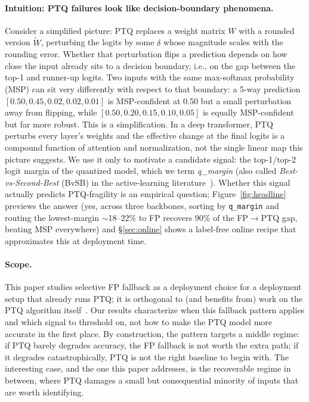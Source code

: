 \documentclass{article}
\newcommand{\fp}{\textsc{FP}\xspace}
\newcommand{\ptq}{\textsc{PTQ}\xspace}
\begin{document}
\paragraph{Intuition: PTQ failures look like decision-boundary phenomena.}
Consider a simplified picture: \ptq{} replaces a weight matrix $W$ with a rounded version $\widetilde{W}$, perturbing the logits by some $\delta$ whose magnitude scales with the rounding error. Whether that perturbation flips a prediction depends on how close the input already sits to a decision boundary, i.e., on the gap between the top-1 and runner-up logits. Two inputs with the same max-softmax probability (MSP) can sit very differently with respect to that boundary: a 5-way prediction $[0.50, 0.45, 0.02, 0.02, 0.01]$ is MSP-confident at 0.50 but a small perturbation away from flipping, while $[0.50, 0.20, 0.15, 0.10, 0.05]$ is equally MSP-confident but far more robust. This is a simplification. In a deep transformer, \ptq{} perturbs every layer's weights and the effective change at the final logits is a compound function of attention and normalization, not the single linear map this picture suggests. We use it only to motivate a candidate signal: the top-1/top-2 logit margin of the quantized model, which we term \emph{q\_margin} (also called \emph{Best-vs-Second-Best} (BvSB) in the active-learning literature~\cite{joshi2009multi}). Whether this signal actually predicts PTQ-fragility is an empirical question; Figure~\ref{fig:headline} previews the answer (yes, across three backbones, sorting by \texttt{q\_margin} and routing the lowest-margin $\sim$18--22\% to \fp{} recovers 90\% of the \fp$\to$\ptq{} gap, beating MSP everywhere) and \S\ref{sec:online} shows a label-free online recipe that approximates this at deployment time.

\paragraph{Scope.}
This paper studies selective \fp{} fallback as a deployment choice for a deployment setup that already runs \ptq{}; it is orthogonal to (and benefits from) work on the \ptq{} algorithm itself~\cite{frantar2023gptq,lin2024awq,xiao2023smoothquant,ashkboos2024quarot,li2023repqvit}. Our results characterize when this fallback pattern applies and which signal to threshold on, not how to make the \ptq{} model more accurate in the first place. By construction, the pattern targets a middle regime: if \ptq{} barely degrades accuracy, the \fp{} fallback is not worth the extra path; if it degrades catastrophically, \ptq{} is not the right baseline to begin with. The interesting case, and the one this paper addresses, is the recoverable regime in between, where \ptq{} damages a small but consequential minority of inputs that are worth identifying.
\end{document}
